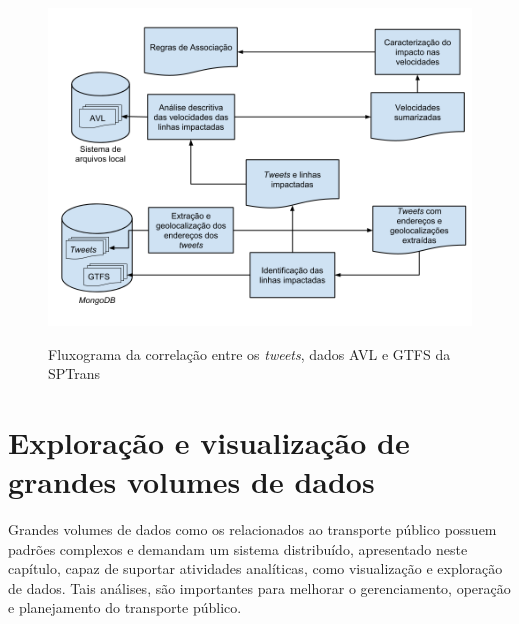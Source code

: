\documentclass[
	12pt,				%
	oneside,			%
	a4paper,			%
	english,			%
	brazil				%
	]{abntex2ppgsi}
\begin{document}
{{\begin{figure}[H]%
	\centering
 	  \caption{Fluxograma da correlação entre os \textit{tweets}, dados AVL e GTFS da SPTrans}
		\includegraphics[width=1\linewidth]{images/caracterization_flow.png}
	\label{fig:caracterization_flow}
\end{figure}



\chapter{Exploração e visualização de grandes volumes de dados}
\label{dataViz}

Grandes volumes de dados como os relacionados ao transporte público possuem padrões complexos e demandam um sistema distribuído, apresentado neste capítulo, capaz de suportar atividades analíticas, como visualização e exploração de dados. Tais análises, são importantes para melhorar o gerenciamento, operação e planejamento do transporte público.

}}
\end{document}
